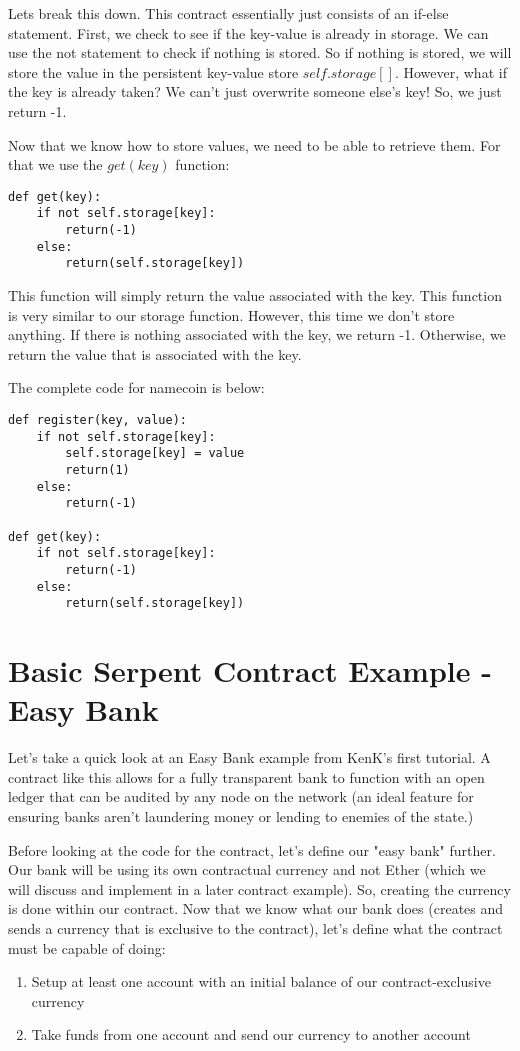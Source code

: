 \documentclass[12pt]{article}
\begin{document}
Lets break this down. This contract essentially just consists of an if-else statement. First, we check to see if the key-value is already in storage. We can use the not statement to check if nothing is stored. So if nothing is stored, we will store the value in the persistent key-value store $self.storage[]$. However, what if the key is already taken? We can't just overwrite someone else's key! So, we just return -1. 

Now that we know how to store values, we need to be able to retrieve them. For that we use the $get(key)$ function:

\begin{verbatim}
def get(key):
	if not self.storage[key]:
		return(-1)
	else:
		return(self.storage[key])
\end{verbatim}

This function will simply return the value associated with the key. This function is very similar to our storage function. However, this time we don't store anything. If there is nothing associated with the key, we return -1. Otherwise, we return the value that is associated with the key.

The complete code for namecoin is below:

\begin{mdframed}
\begin{verbatim}
def register(key, value):
	if not self.storage[key]:
		self.storage[key] = value
		return(1)
	else:
		return(-1)

def get(key):
	if not self.storage[key]:
		return(-1)
	else:
		return(self.storage[key])
\end{verbatim}
\end{mdframed}

\section{Basic Serpent Contract Example - Easy Bank}
Let's take a quick look at an Easy Bank example from KenK's first tutorial. A contract like this allows for a fully transparent bank to function with an open ledger that can be audited by any node on the network (an ideal feature for ensuring banks aren't laundering money or lending to enemies of the state.)

Before looking at the code for the contract, let's define our "easy bank" further. Our bank will be using its own contractual currency and not Ether (which we will discuss and implement in a later contract example). So, creating the currency is done within our contract. Now that we know what our bank does (creates and sends a currency that is exclusive to the contract), let's define what the contract must be capable of doing:
\begin{enumerate}
\item Setup at least one account with an initial balance of our contract-exclusive currency
\item Take funds from one account and send our currency to another account
\end{enumerate}
\end{document}
